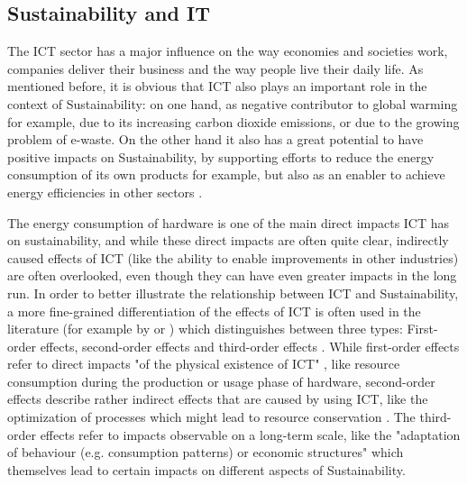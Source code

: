 \documentclass[oribibl]{llncs}
\begin{document}

\subsection{Sustainability and IT}
The ICT sector has a major influence on the way economies and societies work, companies deliver their business and the way people live their daily life. As mentioned before, it is obvious that ICT also plays an important role in the context of Sustainability: on one hand, as negative contributor to global warming for example, due to its increasing carbon dioxide emissions, %
or due to the growing problem of e-waste. %
On the other hand it also has a great potential to have positive impacts on Sustainability, by supporting efforts to reduce the energy consumption of its own products for example, but also as an enabler to achieve energy efficiencies in other sectors \cite{smart2020}. %

The energy consumption of hardware is one of the main direct impacts ICT has on sustainability, and while these direct impacts are often quite clear, indirectly caused effects of ICT (like the ability to enable improvements in other industries) are often overlooked, even though they can have even greater impacts in the long run. In order to better illustrate the relationship between ICT and Sustainability, a more fine-grained differentiation of the effects of ICT is often used in the literature (for example by \cite{hilty_relevance_2006} or \cite{naumann_greensoft_2011}) which distinguishes between three types: First-order effects, second-order effects and third-order effects \cite{berkhout_impacts_2001}. %
While first-order effects refer to direct impacts "of the physical existence of ICT" \cite{hilty_relevance_2006}, like resource consumption during the production or usage phase of hardware, second-order effects describe rather indirect effects that are caused by using ICT, like the optimization of processes which might lead to resource conservation \cite{naumann_greensoft_2011}. The third-order effects refer to impacts observable on a long-term scale, like the "adaptation of behaviour (e.g. consumption patterns) or economic structures" \cite{hilty_relevance_2006} which themselves lead to certain impacts on different aspects of Sustainability.  %
\end{document}
